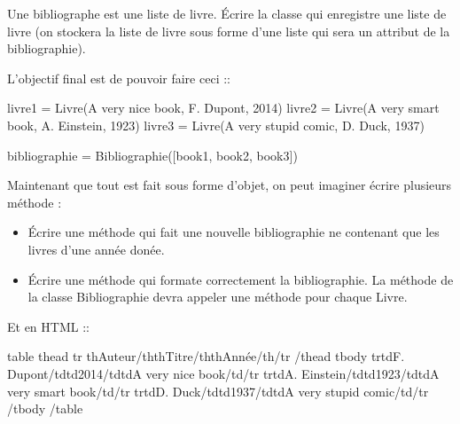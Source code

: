 \documentclass[letterpaper,10pt,english]{sphinxhowto}
\begin{document}
\sphinxAtStartPar
Une bibliographe est une liste de livre. Écrire la classe  qui enregistre une liste de livre (on stockera la liste de livre sous forme d’une liste qui sera un attribut de la bibliographie).

\sphinxAtStartPar
L’objectif final est de pouvoir faire ceci ::

\begin{sphinxVerbatim}[commandchars=\\\{\}]
livre1 = Livre(\PYGZdq{}A very nice book\PYGZdq{}, \PYGZdq{}F. Dupont\PYGZdq{}, 2014)
livre2 = Livre(\PYGZdq{}A very smart book\PYGZdq{}, \PYGZdq{}A. Einstein\PYGZdq{}, 1923)
livre3 = Livre(\PYGZdq{}A very stupid comic\PYGZdq{}, \PYGZdq{}D. Duck\PYGZdq{}, 1937)

bibliographie = Bibliographie([book1, book2, book3])
\end{sphinxVerbatim}

\sphinxAtStartPar
Maintenant que tout est fait sous forme d’objet, on peut imaginer écrire plusieurs méthode :
\begin{itemize}
\item {} 
\sphinxAtStartPar
Écrire une méthode  qui fait une nouvelle bibliographie ne contenant que les livres d’une année donée.

\item {} 
\sphinxAtStartPar
Écrire une méthode  qui formate correctement la bibliographie. La méthode de la classe Bibliographie devra appeler une méthode pour chaque Livre.

\end{itemize}

\sphinxAtStartPar
Et en HTML ::

\begin{sphinxVerbatim}[commandchars=\\\{\}]
\PYGZlt{}table\PYGZgt{}
    \PYGZlt{}thead\PYGZgt{}
        \PYGZlt{}tr\PYGZgt{} \PYGZlt{}th\PYGZgt{}Auteur\PYGZlt{}/th\PYGZgt{}\PYGZlt{}th\PYGZgt{}Titre\PYGZlt{}/th\PYGZgt{}\PYGZlt{}th\PYGZgt{}Année\PYGZlt{}/th\PYGZgt{}\PYGZlt{}/tr\PYGZgt{}
    \PYGZlt{}/thead\PYGZgt{}
    \PYGZlt{}tbody\PYGZgt{}
       \PYGZlt{}tr\PYGZgt{}\PYGZlt{}td\PYGZgt{}F. Dupont\PYGZlt{}/td\PYGZgt{}\PYGZlt{}td\PYGZgt{}2014\PYGZlt{}/td\PYGZgt{}\PYGZlt{}td\PYGZgt{}A very nice book\PYGZlt{}/td\PYGZgt{}\PYGZlt{}/tr\PYGZgt{}
       \PYGZlt{}tr\PYGZgt{}\PYGZlt{}td\PYGZgt{}A. Einstein\PYGZlt{}/td\PYGZgt{}\PYGZlt{}td\PYGZgt{}1923\PYGZlt{}/td\PYGZgt{}\PYGZlt{}td\PYGZgt{}A very smart book\PYGZlt{}/td\PYGZgt{}\PYGZlt{}/tr\PYGZgt{}
       \PYGZlt{}tr\PYGZgt{}\PYGZlt{}td\PYGZgt{}D. Duck\PYGZlt{}/td\PYGZgt{}\PYGZlt{}td\PYGZgt{}1937\PYGZlt{}/td\PYGZgt{}\PYGZlt{}td\PYGZgt{}A very stupid comic\PYGZlt{}/td\PYGZgt{}\PYGZlt{}/tr\PYGZgt{}
    \PYGZlt{}/tbody\PYGZgt{}
\PYGZlt{}/table\PYGZgt{}
\end{sphinxVerbatim}
\end{document}
